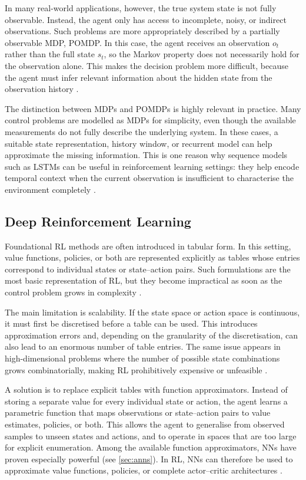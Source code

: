 In many real-world applications, however, the true system state is not fully observable. Instead, the agent only has access to incomplete, noisy, or indirect observations. Such problems are more appropriately described by a partially observable MDP, \ac{POMDP}. In this case, the agent receives an observation $o_t$ rather than the full state $s_t$, so the Markov property does not necessarily hold for the observation alone. This makes the decision problem more difficult, because the agent must infer relevant information about the hidden state from the observation history \cite{sutton_reinforcement_2020}.

The distinction between \acp{MDP} and \acp{POMDP} is highly relevant in practice. Many control problems are modelled as \acp{MDP} for simplicity, even though the available measurements do not fully describe the underlying system. In these cases, a suitable state representation, history window, or recurrent model can help approximate the missing information. This is one reason why sequence models such as \acp{LSTM} can be useful in reinforcement learning settings: they help encode temporal context when the current observation is insufficient to characterise the environment completely \cite{sutton_reinforcement_2020, ni_recurrent_2022, hausknecht_deep_2017}.

\subsection{Deep Reinforcement Learning}
Foundational \ac{RL} methods are often introduced in tabular form. In this setting, value functions, policies, or both are represented explicitly as tables whose entries correspond to individual states or state--action pairs. Such formulations are the most basic representation of \ac{RL}, but they become impractical as soon as the control problem grows in complexity \cite{sutton_reinforcement_2020}.

The main limitation is scalability. If the state space or action space is continuous, it must first be discretised before a table can be used. This introduces approximation errors and, depending on the granularity of the discretisation, can also lead to an enormous number of table entries. The same issue appears in high-dimensional problems where the number of possible state combinations grows combinatorially, making \ac{RL} prohibitively expensive or unfeasible \cite{lillicrap_continuous_2019, sutton_reinforcement_2020}.

A solution is to replace explicit tables with function approximators. Instead of storing a separate value for every individual state or action, the agent learns a parametric function that maps observations or state--action pairs to value estimates, policies, or both. This allows the agent to generalise from observed samples to unseen states and actions, and to operate in spaces that are too large for explicit enumeration. Among the available function approximators, \acp{NN} have proven especially powerful (see \autoref{sec:anns}). In \ac{RL}, \acp{NN} can therefore be used to approximate value functions, policies, or complete actor--critic architectures \cite{sutton_reinforcement_2020}.

